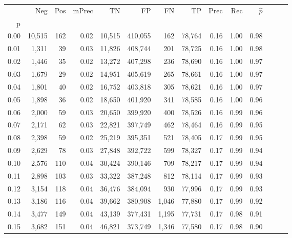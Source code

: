 \begin{tabular}{rrrrrrrrrrrrrr}
\toprule
{} &     Neg &    Pos & mPrec &       TN &       FP &      FN &      TP &  Prec &   Rec & $\hat{p}$ \\
p    &         &        &       &          &          &         &         &       &       &           \\
\midrule
0.00 &  10,515 &    162 &  0.02 &   10,515 &  410,055 &     162 &  78,764 &  0.16 &  1.00 &      0.98 \\
0.01 &   1,311 &     39 &  0.03 &   11,826 &  408,744 &     201 &  78,725 &  0.16 &  1.00 &      0.98 \\
0.02 &   1,446 &     35 &  0.02 &   13,272 &  407,298 &     236 &  78,690 &  0.16 &  1.00 &      0.97 \\
0.03 &   1,679 &     29 &  0.02 &   14,951 &  405,619 &     265 &  78,661 &  0.16 &  1.00 &      0.97 \\
0.04 &   1,801 &     40 &  0.02 &   16,752 &  403,818 &     305 &  78,621 &  0.16 &  1.00 &      0.97 \\
0.05 &   1,898 &     36 &  0.02 &   18,650 &  401,920 &     341 &  78,585 &  0.16 &  1.00 &      0.96 \\
0.06 &   2,000 &     59 &  0.03 &   20,650 &  399,920 &     400 &  78,526 &  0.16 &  0.99 &      0.96 \\
0.07 &   2,171 &     62 &  0.03 &   22,821 &  397,749 &     462 &  78,464 &  0.16 &  0.99 &      0.95 \\
0.08 &   2,398 &     59 &  0.02 &   25,219 &  395,351 &     521 &  78,405 &  0.17 &  0.99 &      0.95 \\
0.09 &   2,629 &     78 &  0.03 &   27,848 &  392,722 &     599 &  78,327 &  0.17 &  0.99 &      0.94 \\
0.10 &   2,576 &    110 &  0.04 &   30,424 &  390,146 &     709 &  78,217 &  0.17 &  0.99 &      0.94 \\
0.11 &   2,898 &    103 &  0.03 &   33,322 &  387,248 &     812 &  78,114 &  0.17 &  0.99 &      0.93 \\
0.12 &   3,154 &    118 &  0.04 &   36,476 &  384,094 &     930 &  77,996 &  0.17 &  0.99 &      0.93 \\
0.13 &   3,186 &    116 &  0.04 &   39,662 &  380,908 &   1,046 &  77,880 &  0.17 &  0.99 &      0.92 \\
0.14 &   3,477 &    149 &  0.04 &   43,139 &  377,431 &   1,195 &  77,731 &  0.17 &  0.98 &      0.91 \\
0.15 &   3,682 &    151 &  0.04 &   46,821 &  373,749 &   1,346 &  77,580 &  0.17 &  0.98 &      0.90 \\

\end{tabular}

